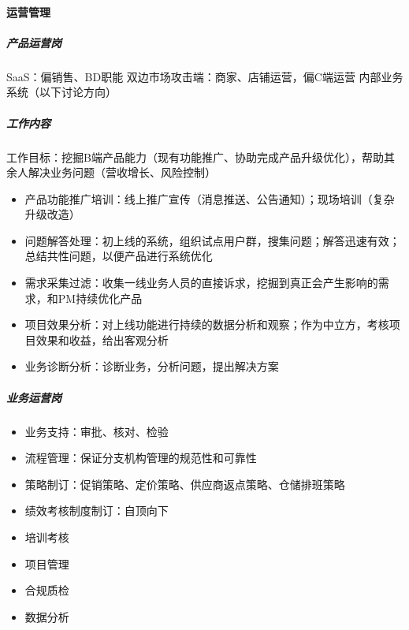 \documentclass[letterpaper,11pt,english]{sphinxmanual}
\begin{document}
\paragraph{运营管理}
\label{\detokenize{chapter_introduction/2B:id23}}

\subparagraph{产品运营岗}
\label{\detokenize{chapter_introduction/2B:id24}}
SaaS：偏销售、BD职能 双边市场攻击端：商家、店铺运营，偏C端运营
内部业务系统（以下讨论方向）


\subparagraph{工作内容}
\label{\detokenize{chapter_introduction/2B:id25}}
工作目标：挖掘B端产品能力（现有功能推广、协助完成产品升级优化），帮助其余人解决业务问题（营收增长、风险控制）
\begin{itemize}
\item {} 
产品功能推广培训：线上推广宣传（消息推送、公告通知）；现场培训（复杂升级改造）

\item {} 
问题解答处理：初上线的系统，组织试点用户群，搜集问题；解答迅速有效；总结共性问题，以便产品进行系统优化

\item {} 
需求采集过滤：收集一线业务人员的直接诉求，挖掘到真正会产生影响的需求，和PM持续优化产品

\item {} 
项目效果分析：对上线功能进行持续的数据分析和观察；作为中立方，考核项目效果和收益，给出客观分析

\item {} 
业务诊断分析：诊断业务，分析问题，提出解决方案

\end{itemize}


\subparagraph{业务运营岗}
\label{\detokenize{chapter_introduction/2B:id26}}\begin{itemize}
\item {} 
业务支持：审批、核对、检验

\item {} 
流程管理：保证分支机构管理的规范性和可靠性

\item {} 
策略制订：促销策略、定价策略、供应商返点策略、仓储排班策略

\item {} 
绩效考核制度制订：自顶向下

\item {} 
培训考核

\item {} 
项目管理

\item {} 
合规质检

\item {} 
数据分析

\end{itemize}
\end{document}
